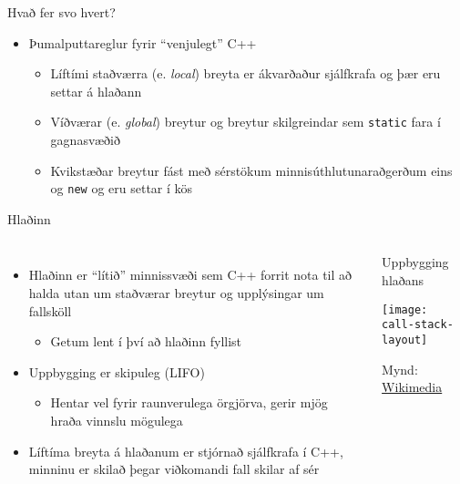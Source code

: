 \documentclass[handout]{beamer}
\begin{document}
\begin{frame}{Hvað fer svo hvert?}
\begin{itemize}
 \item Þumalputtareglur fyrir ``venjulegt'' C++
 \begin{itemize}
  \item Líftími staðværra (e. \emph{local}) breyta er ákvarðaður sjálfkrafa og þær eru settar á hlaðann
  \item Víðværar (e. \emph{global}) breytur og breytur skilgreindar sem \texttt{static} fara í gagnasvæðið
  \item Kvikstæðar breytur fást með sérstökum minnisúthlutunaraðgerðum eins og \texttt{new} og eru settar í kös
 \end{itemize}
\end{itemize}
\end{frame}

\begin{frame}{Hlaðinn}
\begin{columns}
\begin{itemize}
 \item Hlaðinn er ``lítið'' minnissvæði sem C++ forrit nota til að halda utan um staðværar breytur og upplýsingar um fallsköll
 \begin{itemize}
  \item Getum lent í því að hlaðinn fyllist
 \end{itemize}
 \item Uppbygging er skipuleg (LIFO)
 \begin{itemize}
  \item Hentar vel fyrir raunverulega örgjörva, gerir mjög hraða vinnslu mögulega
 \end{itemize}
 \item Líftíma breyta á hlaðanum er stjórnað sjálfkrafa í C++, minninu er skilað þegar viðkomandi fall skilar af sér
\end{itemize}
\begin{center}
Uppbygging hlaðans

\texttt{[image: call-stack-layout]}

{\tiny Mynd: \href{https://en.wikipedia.org/wiki/File:Call_stack_layout.svg}{Wikimedia}}
\end{center}
\end{columns}
\end{frame}
\end{document}
